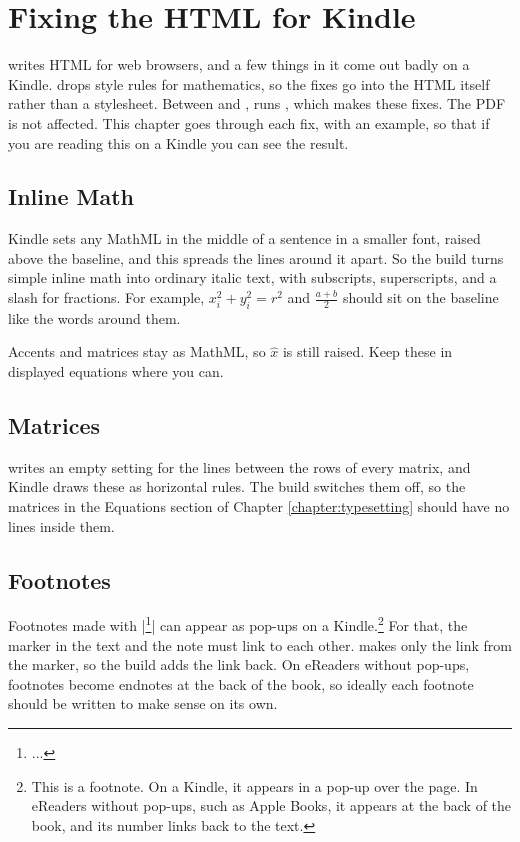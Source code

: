 \chapter{Fixing the HTML for Kindle}
\label{chapter:kindle}

 writes HTML for web browsers, and a few things in it come out badly on a Kindle.
 drops style rules for mathematics, so the fixes go into the HTML itself rather than a stylesheet.
Between  and ,  runs , which makes these fixes.
The PDF is not affected.
This chapter goes through each fix, with an example, so that if you are reading this on a Kindle you can see the result.

\section{Inline Math}

Kindle sets any MathML in the middle of a sentence in a smaller font, raised above the baseline, and this spreads the lines around it apart.
So the build turns simple inline math into ordinary italic text, with subscripts, superscripts, and a slash for fractions.
For example, $x_i^2 + y_i^2 = r^2$ and $\frac{a+b}{2}$ should sit on the baseline like the words around them.

Accents and matrices stay as MathML, so $\hat{x}$ is still raised.
Keep these in displayed equations where you can.

\section{Matrices}

 writes an empty setting for the lines between the rows of every matrix, and Kindle draws these as horizontal rules.
The build switches them off, so the matrices in the Equations section of Chapter \ref{chapter:typesetting} should have no lines inside them.

\section{Footnotes}

Footnotes made with \sverb|\footnote{...}| can appear as pop-ups on a Kindle.\footnote{This is a footnote.
On a Kindle, it appears in a pop-up over the page.
In eReaders without pop-ups, such as Apple Books, it appears at the back of the book, and its number links back to the text.}
For that, the marker in the text and the note must link to each other.
 makes only the link from the marker, so the build adds the link back.
On eReaders without pop-ups, footnotes become endnotes at the back of the book, so ideally each footnote should be written to make sense on its own.

